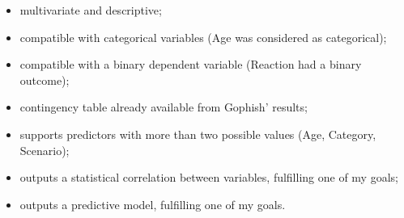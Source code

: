 \documentclass[a4paper]{article}
\begin{document}
\begin{itemize}
    \item multivariate and descriptive;
    \item compatible with categorical variables (Age was considered as categorical);
    \item compatible with a binary dependent variable (Reaction had a binary outcome);
    \item contingency table already available from Gophish' results;
    \item supports predictors with more than two possible values (Age, Category, Scenario);
    \item outputs a statistical correlation between variables, fulfilling one of my goals;
    \item outputs a predictive model, fulfilling one of my goals.
\end{itemize}
\end{document}
